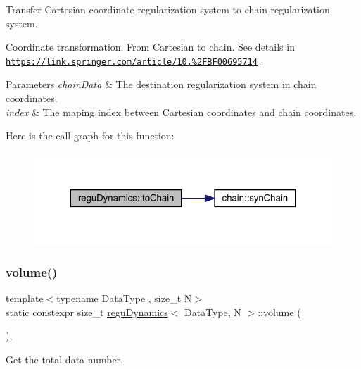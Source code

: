 Transfer Cartesian coordinate regularization system to chain regularization system. 

Coordinate transformation. From Cartesian to chain. See details in \href{https://link.springer.com/article/10.1007%2FBF00695714}{\tt https\+://link.\+springer.\+com/article/10.\+1007\%2\+F\+B\+F00695714} . 
\begin{DoxyParams}{Parameters}
{\em chain\+Data} & The destination regularization system in chain coordinates. \\
\hline
{\em index} & The maping index between Cartesian coordinates and chain coordinates. \\
\hline
\end{DoxyParams}
Here is the call graph for this function\+:\nopagebreak
\begin{figure}[H]
\begin{center}
\leavevmode
\includegraphics[width=323pt]{classregu_dynamics_aae4e77bbbb00f0bdddb396047f1c0fc2_cgraph}
\end{center}
\end{figure}
\mbox{\label{classregu_dynamics_a3a00b2009ce88898871ca024c30c6882}} 
\subsubsection{\texorpdfstring{volume()}{volume()}}
{\footnotesize\ttfamily template$<$typename Data\+Type , size\+\_\+t N$>$ \\
static constexpr size\+\_\+t \mbox{\hyperlink{classregu_dynamics}{regu\+Dynamics}}$<$ Data\+Type, N $>$\+::volume (\begin{DoxyParamCaption}{ }\end{DoxyParamCaption})\hspace{0.3cm}{\ttfamily [inline]}, {\ttfamily [static]}}



Get the total data number. 

